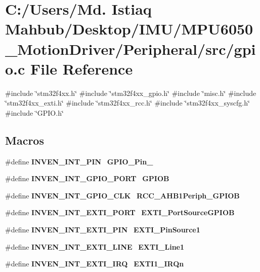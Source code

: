 \section{C\+:/\+Users/\+Md. Istiaq Mahbub/\+Desktop/\+I\+M\+U/\+M\+P\+U6050\+\_\+\+Motion\+Driver/\+Peripheral/src/gpio.c File Reference}
\label{gpio_8c}
{\ttfamily \#include \char`\"{}stm32f4xx.\+h\char`\"{}}\newline
{\ttfamily \#include \char`\"{}stm32f4xx\+\_\+gpio.\+h\char`\"{}}\newline
{\ttfamily \#include \char`\"{}misc.\+h\char`\"{}}\newline
{\ttfamily \#include \char`\"{}stm32f4xx\+\_\+exti.\+h\char`\"{}}\newline
{\ttfamily \#include \char`\"{}stm32f4xx\+\_\+rcc.\+h\char`\"{}}\newline
{\ttfamily \#include \char`\"{}stm32f4xx\+\_\+syscfg.\+h\char`\"{}}\newline
{\ttfamily \#include \char`\"{}G\+P\+I\+O.\+h\char`\"{}}\newline
\subsection*{Macros}
\begin{DoxyCompactItemize}
\item 
\#define \textbf{ I\+N\+V\+E\+N\+\_\+\+I\+N\+T\+\_\+\+P\+IN}~\textbf{ G\+P\+I\+O\+\_\+\+Pin\+\_}
\item 
\#define \textbf{ I\+N\+V\+E\+N\+\_\+\+I\+N\+T\+\_\+\+G\+P\+I\+O\+\_\+\+P\+O\+RT}~\textbf{ G\+P\+I\+OB}
\item 
\#define \textbf{ I\+N\+V\+E\+N\+\_\+\+I\+N\+T\+\_\+\+G\+P\+I\+O\+\_\+\+C\+LK}~\textbf{ R\+C\+C\+\_\+\+A\+H\+B1\+Periph\+\_\+\+G\+P\+I\+OB}
\item 
\#define \textbf{ I\+N\+V\+E\+N\+\_\+\+I\+N\+T\+\_\+\+E\+X\+T\+I\+\_\+\+P\+O\+RT}~\textbf{ E\+X\+T\+I\+\_\+\+Port\+Source\+G\+P\+I\+OB}
\item 
\#define \textbf{ I\+N\+V\+E\+N\+\_\+\+I\+N\+T\+\_\+\+E\+X\+T\+I\+\_\+\+P\+IN}~\textbf{ E\+X\+T\+I\+\_\+\+Pin\+Source1}
\item 
\#define \textbf{ I\+N\+V\+E\+N\+\_\+\+I\+N\+T\+\_\+\+E\+X\+T\+I\+\_\+\+L\+I\+NE}~\textbf{ E\+X\+T\+I\+\_\+\+Line1}
\item 
\#define \textbf{ I\+N\+V\+E\+N\+\_\+\+I\+N\+T\+\_\+\+E\+X\+T\+I\+\_\+\+I\+RQ}~\textbf{ E\+X\+T\+I1\+\_\+\+I\+R\+Qn}
\end{DoxyCompactItemize}
